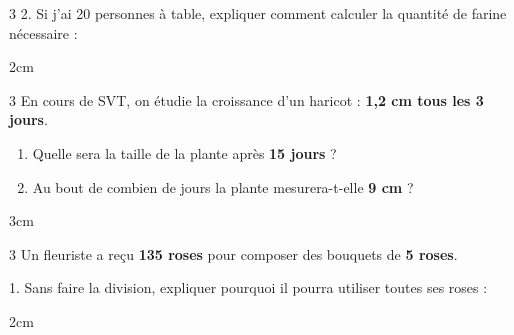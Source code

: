 \documentclass[a4paper]{book}
\begin{document}
{\begin{exerciceNote}{3}
        2. Si j'ai 20 personnes à table, expliquer comment calculer la quantité de farine nécessaire :
        \begin{ZoneReponse}{2cm}
        \end{ZoneReponse}
    \end{exerciceNote}
    
    \begin{exerciceNote}{3}
        En cours de SVT, on étudie la croissance d'un haricot : \textbf{1,2 cm tous les 3 jours}.
        \begin{enumerate}[leftmargin=*]
            \item Quelle sera la taille de la plante après \textbf{15 jours} ?
            \item Au bout de combien de jours la plante mesurera-t-elle \textbf{9 cm} ?
        \end{enumerate}
        
        \begin{ZoneReponse}{3cm}
        \end{ZoneReponse}
    \end{exerciceNote}
    
    \begin{exerciceNote}{3}
        Un fleuriste a reçu \textbf{135 roses} pour composer des bouquets de \textbf{5 roses}.
        
        1. Sans faire la division, expliquer pourquoi il pourra utiliser toutes ses roses :
        \begin{ZoneReponse}{2cm}
        \end{ZoneReponse}
    

\end{exerciceNote}}
\end{document}
